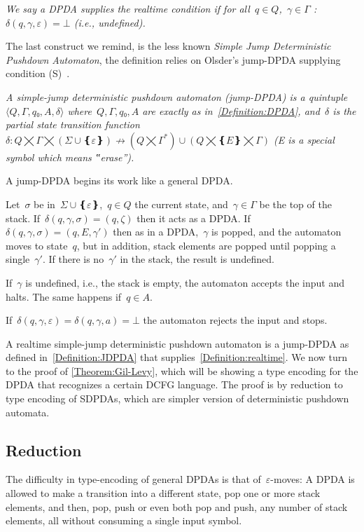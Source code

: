 \begin{Definition}
  \label{Definition:realtime}
  \slshape
We say a DPDA supplies the \emph{realtime condition} if
  for all~$q∈Q$,~$γ∈Γ$ :~$δ(q,γ,ε)=⊥$ (i.e., undefined).
\end{Definition}

The last construct we remind, is the less known \emph{Simple Jump Deterministic Pushdown Automaton},
the definition relies on Olsder's jump-DPDA supplying condition (S)~\cite{Olsder:05}.

\begin{Definition}
  \label{Definition:JDPDA}
  \slshape
  A \emph{simple-jump deterministic pushdown automaton} (jump-DPDA) is a quintuple~$⟨Q,Γ,q₀,A,δ⟩$
  where~$Q,Γ,q₀,A$ are exactly as in~\cref{Definition:DPDA},
  and~$δ$ is the
  \emph{partial state transition function}~$δ:Q⨉Γ⨉(Σ∪❴ε❵)↛(Q⨉Γ^*)∪(Q⨉❴E❵⨉Γ)$
  (E is a special symbol which means ‟erase”).
  \par
  A jump-DPDA begins its work like a general DPDA\@.
  \par
  Let~$σ$ be in~$Σ∪❴ε❵$,~$q∈Q$ the current state, and~$γ∈Γ$ be the top of the stack.
  If~$δ(q,γ,σ)=(q,ζ)$ then it acts as a DPDA\@.
  If~$δ(q,γ,σ)=(q,E,γ')$ then as in a DPDA,~$γ$ is popped, and the automaton
  moves to state~$q$, but in addition, stack elements are popped until
  popping a single~$γ'$.
  If there is no~$γ'$ in the stack, the result is undefined.
  \par
  If~$γ$ is undefined, i.e., the stack is empty, the automaton accepts the input and halts.
  The same happens if~$q∈A$.
  \par
  If~$δ(q,γ,ε)=δ(q,γ,a)=⊥$ the automaton rejects the input and stops.
\end{Definition}

A realtime simple-jump deterministic pushdown automaton is a jump-DPDA
  as defined in~\cref{Definition:JDPDA}
  that supplies~\cref{Definition:realtime}.
We now turn to the proof of \cref{Theorem:Gil-Levy}, which will be showing a type encoding for the DPDA that recognizes a certain DCFG language.
The proof is by reduction to type encoding of SDPDAs, which are simpler version of deterministic pushdown automata.

\subsection{Reduction}
The difficulty in type-encoding of general DPDAs is that of~$ε$-moves:
A DPDA is allowed to make a transition into a different state,
  pop one or more stack elements, and then, pop, push or even both pop and push, any number of stack elements,
  all without consuming a single input symbol.

